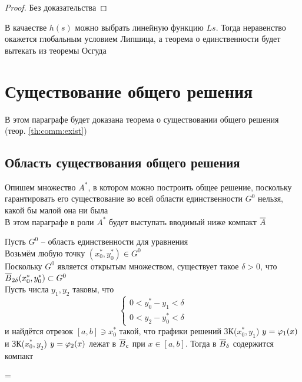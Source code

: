\begin{proof}
	Без доказательства
\end{proof}

\begin{remark}
    В качаестве $ h(s) $ можно выбрать линейную функцию $ Ls $. Тогда неравенство  окажется глобальным условием Липшица, а теорема о единственности будет вытекать из теоремы Осгуда
\end{remark}

\section{Существование общего решения}

В этом параграфе будет доказана теорема о существовании общего решения (теор. \ref{th:comm:exist})

\subsection{Область существования общего решения}

Опишем множество $ A^* $, в котором можно построить общее решение, поскольку гарантировать его существование во всей области единственности $ G^0 $ нельзя, какой бы малой она ни была \\
В этом параграфе в роли $ A^* $ будет выступать вводимый ниже компакт $ \ol{A} $

\begin{algorithm}[построения $ \ol{A} $]
    Пусть $ G^0 $ -- область единственности для уравнения  \\
    Возьмём любую точку $ (x_0^*, y_0^*) \in G^0 $ \\
    Поскольку $ G^0 $ является открытым множеством, существует такое $ \delta > 0 $, что $ \overline{B}_{2\delta}(x_0^*, y_0^*) \subset G^0 $ \\
    Пусть числа $ y_1, y_2 $ таковы, что
    $$
    \begin{cases}
    	0 < y_0^* - y_1 < \delta \\
        0 < y_2 - y_0^* < \delta
    \end{cases} $$
    и найдётся отрезок $ [a, b] \ni x_0^* $ такой, что графики решений ЗК($ x_0^*, y_1 $) $ y = \varphi_1(x) $ и ЗК($ x_0^*, y_2 $) $ y = \varphi_2(x) $ лежат в $ \overline{B}_c $ при $ x \in [a, b] $. Тогда в $ \overline{B}_\delta $ содержится компакт
    \begin{equ}{1.25}
         = 
    \end{equ}
\end{algorithm}


